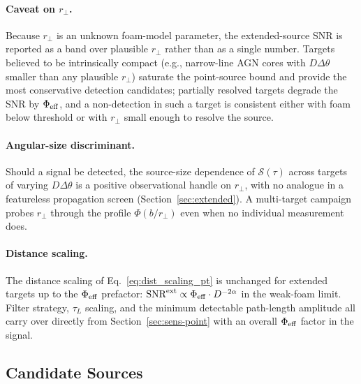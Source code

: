 \documentclass[aps,prd,onecolumn,amsmath,amssymb]{revtex4-2}
\begin{document}
\paragraph{Caveat on $r_\perp$.}
Because $r_\perp$ is an unknown foam-model parameter, the
extended-source SNR is reported as a band over plausible $r_\perp$
rather than as a single number.  Targets believed to be intrinsically
compact (e.g., narrow-line AGN cores with $D\Delta\theta$ smaller than
any plausible $r_\perp$) saturate the point-source bound and provide
the most conservative detection candidates; partially resolved targets
degrade the SNR by $\Phi_{\rm eff}$, and a non-detection in such a
target is consistent either with foam below threshold or with $r_\perp$
small enough to resolve the source.

\paragraph{Angular-size discriminant.}
Should a signal be detected, the source-size dependence of
$\mathcal{S}(\tau)$ across targets of varying $D\Delta\theta$ is a
positive observational handle on $r_\perp$, with no analogue in a
featureless propagation screen (Section~\ref{sec:extended}).  A
multi-target campaign probes $r_\perp$ through the profile
$\Phi(b/r_\perp)$ even when no individual measurement does.

\paragraph{Distance scaling.}
The distance scaling of Eq.~\eqref{eq:dist_scaling_pt} is unchanged for
extended targets up to the $\Phi_{\rm eff}$ prefactor:
$\textrm{SNR}^{\rm ext}\propto \Phi_{\rm eff}\cdot D^{-2\alpha}$ in the
weak-foam limit.  Filter strategy, $\tau_L$ scaling, and the minimum
detectable path-length amplitude all carry over directly from
Section~\ref{sec:sens-point} with an overall $\Phi_{\rm eff}$ factor in
the signal.

\subsection{Candidate Sources}
\label{sec:candidate_sources}
\end{document}
